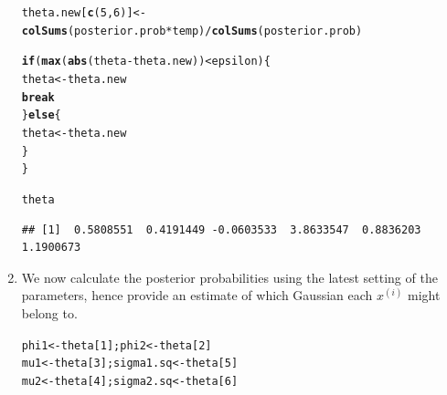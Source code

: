 \documentclass[11pt, a4paper]{article}\usepackage[]{graphicx}\usepackage[]{xcolor}
\makeatletter
\newcommand{\hlnum}[1]{\textcolor[rgb]{0.686,0.059,0.569}{#1}}%
\newcommand{\hlopt}[1]{\textcolor[rgb]{0,0,0}{#1}}%
\newcommand{\hldef}[1]{\textcolor[rgb]{0.345,0.345,0.345}{#1}}%
\newcommand{\hlkwa}[1]{\textcolor[rgb]{0.161,0.373,0.58}{\textbf{#1}}}%
\newcommand{\hlkwb}[1]{\textcolor[rgb]{0.69,0.353,0.396}{#1}}%
\newcommand{\hlkwd}[1]{\textcolor[rgb]{0.737,0.353,0.396}{\textbf{#1}}}%
\newenvironment{kframe}{%
 \def\at@end@of@kframe{}%
 \ifinner\ifhmode%
  \def\at@end@of@kframe{\end{minipage}}%
  \begin{minipage}{\columnwidth}%
 \fi\fi%
 \def\FrameCommand##1{\hskip\@totalleftmargin \hskip-\fboxsep
 \colorbox{shadecolor}{##1}\hskip-\fboxsep
     \hskip-\linewidth \hskip-\@totalleftmargin \hskip\columnwidth}%
 \MakeFramed {\advance\hsize-\width
   \@totalleftmargin\z@ \linewidth\hsize
   \@setminipage}}%
 {\par\unskip\endMakeFramed%
 \at@end@of@kframe}
\newenvironment{knitrout}{}{} %
\makeatother
\begin{document}
\begin{enumerate}
\begin{knitrout}
\begin{kframe}
\begin{alltt}
  \hldef{theta.new[}\hlkwd{c}\hldef{(}\hlnum{5}\hldef{,} \hlnum{6}\hldef{)]} \hlkwb{<-} \hlkwd{colSums}\hldef{(posterior.prob} \hlopt{*} \hldef{temp)} \hlopt{/} \hlkwd{colSums}\hldef{(posterior.prob)}

  \hlkwa{if}\hldef{(}\hlkwd{max}\hldef{(}\hlkwd{abs}\hldef{(theta} \hlopt{-} \hldef{theta.new))} \hlopt{<} \hldef{epsilon)\{}
    \hldef{theta} \hlkwb{<-} \hldef{theta.new}
    \hlkwa{break}
  \hldef{\}}\hlkwa{else}\hldef{\{}
    \hldef{theta} \hlkwb{<-} \hldef{theta.new}
  \hldef{\}}
\hldef{\}}
\end{alltt}
\end{kframe}
\end{knitrout}

\begin{knitrout}
\color{fgcolor}\begin{kframe}
\begin{alltt}
\hldef{theta}
\end{alltt}
\begin{verbatim}
## [1]  0.5808551  0.4191449 -0.0603533  3.8633547  0.8836203  1.1900673
\end{verbatim}
\end{kframe}
\end{knitrout}

\newpage

\item[\scalebox{2.0}{\twemoji{keycap: 3}}] \hspace{0.2cm} We now calculate the posterior probabilities using the latest setting of the parameters, hence provide an estimate of which Gaussian each $x^{(i)}$ might belong to.

\begin{knitrout}
\color{fgcolor}\begin{kframe}
\begin{alltt}
\hldef{phi1} \hlkwb{<-} \hldef{theta[}\hlnum{1}\hldef{]; phi2} \hlkwb{<-} \hldef{theta[}\hlnum{2}\hldef{]}
\hldef{mu1} \hlkwb{<-} \hldef{theta[}\hlnum{3}\hldef{]; sigma1.sq} \hlkwb{<-} \hldef{theta[}\hlnum{5}\hldef{]}
\hldef{mu2} \hlkwb{<-} \hldef{theta[}\hlnum{4}\hldef{]; sigma2.sq} \hlkwb{<-} \hldef{theta[}\hlnum{6}\hldef{]}
\end{alltt}
\end{kframe}
\end{knitrout}


\end{enumerate}
\end{document}
